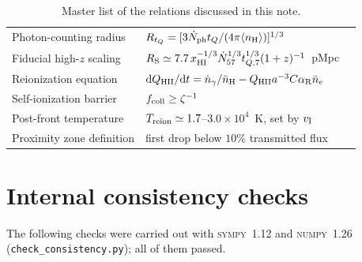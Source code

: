 \documentclass[11pt,a4paper]{article}
\newcommand{\nH}{n_{\rm H}}
\begin{document}
\begin{table}[h]
\begin{tabular}{@{}p{5.6cm}p{6.4cm}p{3.2cm}@{}}
Photon-counting radius & $R_{t_Q}=[3\dot N_{\rm ph}t_Q/(4\pi\langle \nH\rangle)]^{1/3}$ & \citet{Cen2000} \\
Fiducial high-$z$ scaling & $R_{\rm S}\simeq7.7\,x_{\rm HI}^{-1/3}\dot N_{57}^{1/3}t_{Q,7}^{1/3}(1+z)^{-1}$~pMpc & \citet{Mesinger2004} \\
Reionization equation & ${\rm d}Q_{\rm HII}/{\rm d}t=\dot n_\gamma/\bar n_{\rm H}-Q_{\rm HII}a^{-3}C\alpha_{\rm R}\bar n_e$ & \citet{Choudhury2022} \\
Self-ionization barrier & $f_{\rm coll}\ge\zeta^{-1}$ & \citet{Furlanetto2004} \\
Post-front temperature & $T_{\rm reion}\simeq1.7$--$3.0\times10^4$~K, set by $v_{\rm I}$ & \citet{DAloisio2018,Zhu2025} \\
Proximity zone definition & first drop below $10\%$ transmitted flux & \citet{Eilers2017} \\
\bottomrule
\end{tabular}
\caption{Master list of the relations discussed in this note.}
\end{table}

\section{Internal consistency checks}
\label{sec:checks}

The following checks were carried out with \textsc{sympy}~1.12 and \textsc{numpy}~1.26
(\texttt{check\_consistency.py}); all of them passed.
\end{document}
